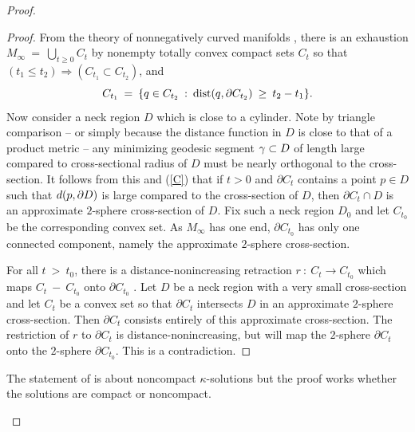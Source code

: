 \begin{proof}
\begin{proof}
From the theory of nonnegatively curved manifolds
\cite[Chapter 8.5]{Cheeger-Ebin},  there is an
exhaustion $M_\infty \: = \: \bigcup_{t\ge 0}C_t$
by nonempty totally convex compact sets $C_t$ so that
$(t_1 \le t_2) \Rightarrow (C_{t_1} \subset C_{t_2})$, and
\begin{equation} \label{C}
C_{t_1} \: = \: \{ q \in C_{t_2} \: : \: \operatorname{dist}(q, \partial C_{t_2})
\: \ge \: t_2 - t_1\}.
\end{equation}
Now consider a
neck region $D$ which is  close to a cylinder.  Note by
triangle comparison -- or simply because the distance function
in $D$ is close to that of a product metric --  any
minimizing geodesic  segment $\gamma\subset D$
of length large compared to cross-sectional radius of $D$ must
be nearly orthogonal to the cross-section.
It follows from this and (\ref{C}) that if $t>0$ and
$\partial C_t$ contains a point $p\in D$ such that $d(p,\partial D)$
is large compared to the cross-section of $D$, then
 $\partial C_t\cap D$ is an approximate $2$-sphere
cross-section of $D$.
Fix such a neck region $D_0$ and let $C_{t_0}$ be the
corresponding convex set.
As $M_\infty$
has one end, $\partial C_{t_0}$ has only one connected
component,
namely the approximate $2$-sphere cross-section.

For all $t \: > \: t_0$, there is a distance-nonincreasing retraction
$r \: : \: C_t \rightarrow C_{t_0}$ which maps $C_t \: - \: C_{t_0}$ onto
$\partial C_{t_0}$ \cite{Sharafutdinov}. Let $D$ be a neck region
with a very small cross-section and let $C_t$ be a convex set so that
$\partial C_t$ intersects $D$ in an approximate $2$-sphere cross-section.
Then $\partial C_t$ consists entirely of this approximate cross-section.
The restriction of $r$ to $\partial C_t$ is distance-nonincreasing, but
will map the $2$-sphere $\partial C_t$ onto
the $2$-sphere $\partial C_{t_0}$. This is a contradiction.
\end{proof}

\begin{remark}
  \label{rem:kl-compactness-space-three-dimensional-solutions-compactness-kappa-solutions}
 The statement of \cite[Theorem 11.7]{Perelman} is about
noncompact $\kappa$-solutions but the proof works whether the
solutions are compact or noncompact.
\end{remark}


\begin{remark}
  \label{rem:kl-compactness-space-three-dimensional-solutions-compactness-kappa-solutions-3}


\end{remark}
\end{proof}
